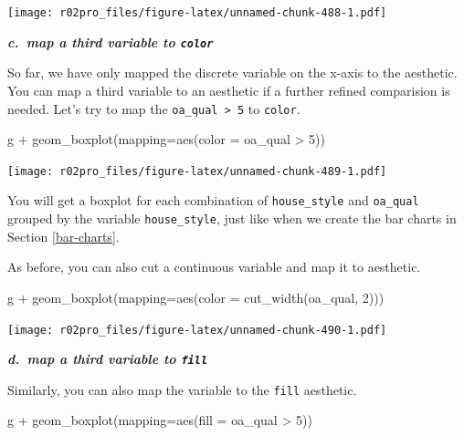 \documentclass[
]{book}
\newenvironment{Shaded}{\begin{snugshade}}{\end{snugshade}}
\newcommand{\AttributeTok}[1]{\textcolor[rgb]{0.77,0.63,0.00}{#1}}
\newcommand{\DecValTok}[1]{\textcolor[rgb]{0.00,0.00,0.81}{#1}}
\newcommand{\FunctionTok}[1]{\textcolor[rgb]{0.00,0.00,0.00}{#1}}
\newcommand{\NormalTok}[1]{#1}
\newcommand{\SpecialCharTok}[1]{\textcolor[rgb]{0.00,0.00,0.00}{#1}}
\begin{document}
\texttt{[image: r02pro\_files/figure-latex/unnamed-chunk-488-1.pdf]}

\textbf{\emph{c.~map a third variable to \texttt{color}}}

So far, we have only mapped the discrete variable on the x-axis to the aesthetic. You can map a third variable to an aesthetic if a further refined comparision is needed. Let's try to map the \texttt{oa\_qual\ \textgreater{}\ 5} to \texttt{color}.

\begin{Shaded}
\begin{Highlighting}[]
\NormalTok{g }\SpecialCharTok{+} \FunctionTok{geom\_boxplot}\NormalTok{(}\AttributeTok{mapping=}\FunctionTok{aes}\NormalTok{(}\AttributeTok{color =}\NormalTok{ oa\_qual }\SpecialCharTok{\textgreater{}} \DecValTok{5}\NormalTok{))}
\end{Highlighting}
\end{Shaded}

\texttt{[image: r02pro\_files/figure-latex/unnamed-chunk-489-1.pdf]}

You will get a boxplot for each combination of \texttt{house\_style} and \texttt{oa\_qual} grouped by the variable \texttt{house\_style}, just like when we create the bar charts in Section \ref{bar-charts}.

As before, you can also cut a continuous variable and map it to aesthetic.

\begin{Shaded}
\begin{Highlighting}[]
\NormalTok{g }\SpecialCharTok{+} \FunctionTok{geom\_boxplot}\NormalTok{(}\AttributeTok{mapping=}\FunctionTok{aes}\NormalTok{(}\AttributeTok{color =} \FunctionTok{cut\_width}\NormalTok{(oa\_qual, }\DecValTok{2}\NormalTok{)))}
\end{Highlighting}
\end{Shaded}

\texttt{[image: r02pro\_files/figure-latex/unnamed-chunk-490-1.pdf]}

\textbf{\emph{d.~map a third variable to \texttt{fill}}}

Similarly, you can also map the variable to the \texttt{fill} aesthetic.

\begin{Shaded}
\begin{Highlighting}[]
\NormalTok{g }\SpecialCharTok{+} \FunctionTok{geom\_boxplot}\NormalTok{(}\AttributeTok{mapping=}\FunctionTok{aes}\NormalTok{(}\AttributeTok{fill =}\NormalTok{ oa\_qual }\SpecialCharTok{\textgreater{}} \DecValTok{5}\NormalTok{))}
\end{Highlighting}
\end{Shaded}
\end{document}
